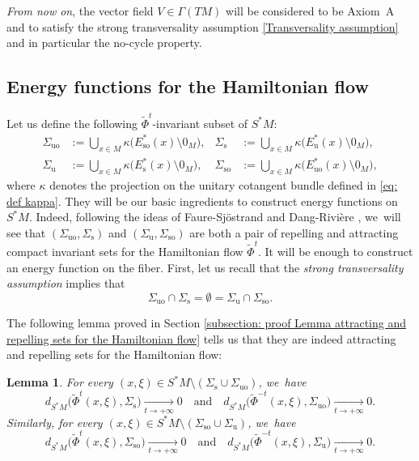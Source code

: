 \documentclass[11pt]{article}
\newcommand{\rs}{\mathrm{s}}
\newcommand{\rso}{\mathrm{so}}
\newcommand{\ru}{\mathrm{u}}
\newcommand{\ruo}{\mathrm{uo}}
\theoremstyle{definition}
\theoremstyle{plain}
\newtheorem{lemma}[definition]{Lemma}
\begin{document}
\emph{From now on}, the vector field $V \in \Gamma (TM)$ will be considered to be Axiom~A and to satisfy the strong transversality assumption \eqref{Transversality assumption} and in particular the no-cycle property.

\subsection{Energy functions for the Hamiltonian flow}\label{subsection: energy function for the hamiltonian flow}

Let us define the following $\widetilde{\Phi}^t$-invariant subset of $S^*M$:
\begin{align*}
\Sigma_{\ruo} &:= \bigcup_{x \in M} \kappa \bigl(E_{\rso}^* (x) \setminus 0_M \bigr),& \Sigma_{\rs}&:= \bigcup_{x \in M} \kappa \bigl(E_\ru^* (x) \setminus 0_M \bigr),\\
\Sigma_{\ru} &:= \bigcup_{x \in M} \kappa \bigl(E_\rs^* (x) \setminus 0_M \bigr),& \Sigma_{\rso}&:= \bigcup_{x \in M} \kappa \bigl(E_{\ruo}^* (x) \setminus 0_M \bigr),
\end{align*}
where $\kappa$ denotes the projection on the unitary cotangent bundle defined in \eqref{eq: def kappa}.
They will be our basic ingredients to construct energy functions on $S^*M$. Indeed, following the ideas of Faure-Sjöstrand \cite{FS} and Dang-Rivière \cite{DR0, DRI}, we~will see that $(\Sigma_{\ruo},\Sigma_{\rs})$ and $(\Sigma_{\ru},\Sigma_{\rso})$ are both a pair of repelling and attracting compact invariant sets for the Hamiltonian flow $\widetilde{\Phi}^t$. It will be enough to construct an energy function on the fiber. First, let us recall that the \textit{strong transversality assumption} implies that
\[
\Sigma_{\ruo} \cap \Sigma_{\rs} = \emptyset = \Sigma_{\ru} \cap \Sigma_{\rso}.
\]

The following lemma proved in Section \ref{subsection: proof Lemma attracting and repelling sets for the Hamiltonian flow} tells us that they are indeed attracting and repelling sets for the Hamiltonian flow:

\begin{lemma}\label{lemma attractor and repeller on the phase space}
For every $(x,\xi) \in S^* M \setminus(\Sigma_{\rs} \cup \Sigma_{\ruo})$, we~have
\[
d_{S^* M} \bigl(\widetilde{\Phi}^{t} (x,\xi), \Sigma_{\rs} \bigr) \underset{t \to +\infty}{\to } 0 \quad\text{and}\quad
d_{S^* M} \bigl(\widetilde{\Phi}^{-t} (x,\xi), \Sigma_{\ruo} \bigr) \underset{t \to +\infty}{\to } 0.
\]
Similarly, for every $(x,\xi) \in S^* M \setminus \left(\Sigma_{\rso} \cup \Sigma_{\ru} \right)$, we~have
\[
d_{S^* M} \bigl(\widetilde{\Phi}^{t} (x,\xi), \Sigma_{\rso} \bigr) \underset{t \to +\infty}{\to } 0 \quad\text{and}\quad
d_{S^* M} \bigl(\widetilde{\Phi}^{-t} (x,\xi), \Sigma_{\ru} \bigr) \underset{t \to +\infty}{\to } 0.
\]
\end{lemma}
\end{document}
